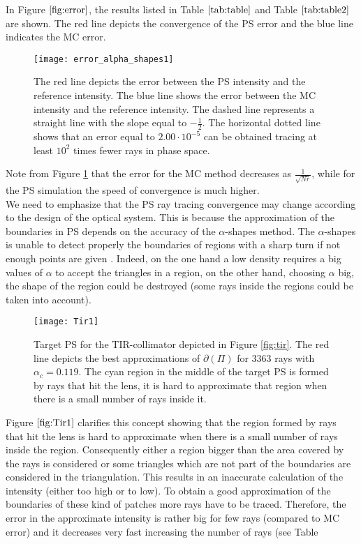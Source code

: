 \noindent In Figure $\ref{fig:error}$, the results listed in Table $\ref{tab:table}$ and Table $\ref{tab:table2}$ are shown. The red line depicts the convergence of the PS error and the blue line indicates the MC error.
\begin{figure}[h!]
  \begin{center}
  \texttt{[image: error\_alpha\_shapes1]}
  \end{center}
  \caption{\footnotesize{ The red line depicts the error between the PS intensity and the reference intensity.
 The blue line shows the error between the MC intensity and the reference intensity.
  The dashed line represents a straight line with the slope equal to $-\frac{1}{2}$.
  The horizontal dotted line shows that an error equal to $2.00 \cdot  10^{-5}$ can be obtained tracing at least $10^2$ times fewer rays in phase space.}}
  \label{fig:error}
\end{figure}
Note from Figure \ref{fig:error} that the error for the MC method decreases as $\frac{1}{\sqrt{Nr}}$, while for the PS simulation the speed of convergence is much higher.\\ \indent
We need to emphasize that the PS ray tracing convergence may change according to the design of the optical system.
This is because the approximation of the boundaries in PS depends on the accuracy of the $\alpha$-shapes method.
The $\alpha$-shapes is unable to detect properly the boundaries of regions with a sharp turn if not enough points are given
\cite{teichmann1998surface}. Indeed, on the one hand a low density requires a big values of $\alpha$ to accept the triangles in a region, on the other hand,
 choosing $\alpha$ big, the shape of the region could be destroyed (some rays inside the regions could be taken into account).
 \begin{figure}[h]
\centering
  \texttt{[image: Tir1]}
    \caption{Target PS for the TIR-collimator depicted in
    Figure \ref{fig:tir}. The red line depicts the best approximations of $\partial$$(\Pi)$ for $3363$ rays with $\alpha_c = 0.119$.
    The cyan region in the middle of the target PS is formed by rays that hit the lens, it is hard to approximate that region when there is a small number of rays inside it.}
     \label{fig:Tir1}
  \end{figure}
Figure $\ref{fig:Tir1}$ clarifies this concept showing that the region formed by rays that hit the lens is hard to approximate when there is a small number of rays inside the region. Consequently either a region bigger than the area covered by the rays is considered or some triangles which are not part of the boundaries are considered in the triangulation. This results in an inaccurate calculation of the intensity (either too high or to low). To obtain a good approximation of the boundaries of these kind of patches more rays have to be traced. Therefore, the error in the approximate intensity is rather big for few rays (compared to MC error) and it decreases very fast increasing the number of rays (see Table
